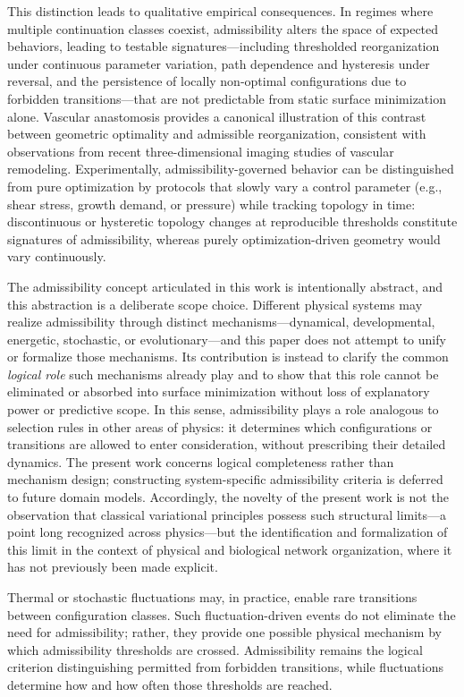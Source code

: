 This distinction leads to qualitative empirical consequences. In regimes where multiple continuation classes coexist, admissibility alters the space of expected behaviors, leading to testable signatures---including thresholded reorganization under continuous parameter variation, path dependence and hysteresis under reversal, and the persistence of locally non-optimal configurations due to forbidden transitions---that are not predictable from static surface minimization alone. Vascular anastomosis provides a canonical illustration of this contrast between geometric optimality and admissible reorganization, consistent with observations from recent three-dimensional imaging studies of vascular remodeling.\cite{Bentley2014} Experimentally, admissibility-governed behavior can be distinguished from pure optimization by protocols that slowly vary a control parameter (e.g., shear stress, growth demand, or pressure) while tracking topology in time: discontinuous or hysteretic topology changes at reproducible thresholds constitute signatures of admissibility, whereas purely optimization-driven geometry would vary continuously.

The admissibility concept articulated in this work is intentionally abstract, and this abstraction is a deliberate scope choice. Different physical systems may realize admissibility through distinct mechanisms---dynamical, developmental, energetic, stochastic, or evolutionary---and this paper does not attempt to unify or formalize those mechanisms. Its contribution is instead to clarify the common \emph{logical role} such mechanisms already play and to show that this role cannot be eliminated or absorbed into surface minimization without loss of explanatory power or predictive scope. In this sense, admissibility plays a role analogous to selection rules in other areas of physics: it determines which configurations or transitions are allowed to enter consideration, without prescribing their detailed dynamics. The present work concerns logical completeness rather than mechanism design; constructing system-specific admissibility criteria is deferred to future domain models. Accordingly, the novelty of the present work is not the observation that classical variational principles possess such structural limits---a point long recognized across physics---but the identification and formalization of this limit in the context of physical and biological network organization, where it has not previously been made explicit.

Thermal or stochastic fluctuations may, in practice, enable rare transitions between configuration classes. Such fluctuation-driven events do not eliminate the need for admissibility; rather, they provide one possible physical mechanism by which admissibility thresholds are crossed. Admissibility remains the logical criterion distinguishing permitted from forbidden transitions, while fluctuations determine how and how often those thresholds are reached.

